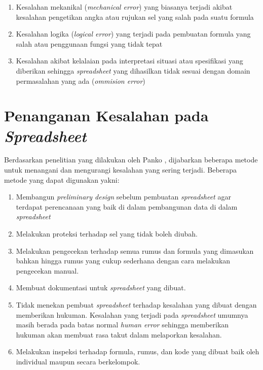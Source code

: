     \begin{enumerate}
        \item Kesalahan mekanikal (\textit{mechanical error}) yang biasanya terjadi akibat kesalahan pengetikan angka atau rujukan sel yang salah pada suatu formula
        \item Kesalahan logika (\textit{logical error}) yang terjadi pada pembuatan formula yang salah atau penggunaan fungsi yang tidak tepat
        \item Kesalahan akibat kelalaian pada interpretasi situasi atau spesifikasi yang diberikan sehingga \textit{spreadsheet} yang dihasilkan tidak sesuai dengan domain permasalahan yang ada \parencite{Powell2009} (\textit{ommision error})
    \end{enumerate}

\section{Penanganan Kesalahan pada \textit{Spreadsheet}}
Berdasarkan penelitian yang dilakukan oleh Panko \parencite{Panko1998}, dijabarkan beberapa metode untuk menangani dan mengurangi kesalahan yang sering terjadi. Beberapa metode yang dapat digunakan yakni:

    \begin{enumerate}
        \item Membangun \textit{preliminary design} sebelum pembuatan \textit{spreadsheet} agar terdapat perencanaan yang baik di dalam pembangunan data di dalam \textit{spreadsheet}
        \item Melakukan proteksi terhadap sel yang tidak boleh diubah.
        \item Melakukan pengecekan terhadap semua rumus dan formula yang dimasukan bahkan hingga rumus yang cukup sederhana dengan cara melakukan pengecekan manual.
        \item Membuat dokumentasi untuk \textit{spreadsheet} yang dibuat.
        \item Tidak menekan pembuat \textit{spreadsheet} terhadap kesalahan yang dibuat dengan memberikan hukuman. Kesalahan yang terjadi pada \textit{spreadsheet} umumnya masih berada pada batas normal \textit{human error} sehingga memberikan hukuman akan membuat rasa takut dalam melaporkan kesalahan.
        \item Melakukan inspeksi terhadap formula, rumus, dan kode yang dibuat baik oleh individual maupun secara berkelompok.
    \end{enumerate}

